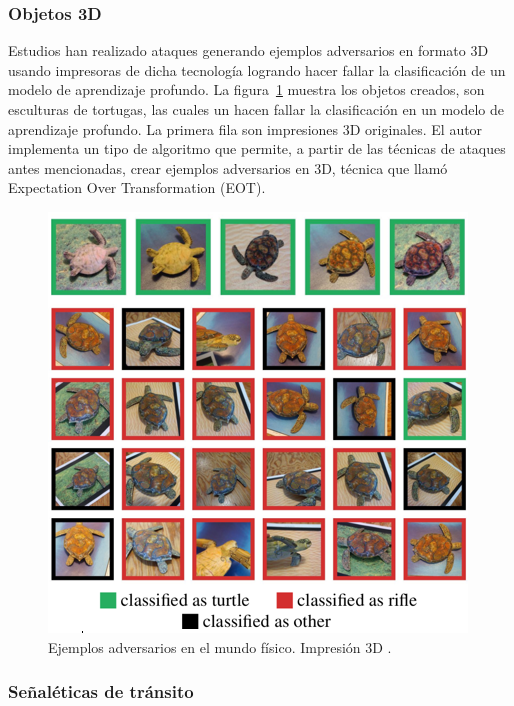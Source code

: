 \subsubsection{Objetos 3D}

Estudios han realizado ataques generando ejemplos adversarios en formato 3D usando impresoras de dicha tecnología \parencite{r52} logrando hacer fallar la clasificación de un modelo de aprendizaje profundo. La figura~\ref{fig:24} muestra los objetos creados, son esculturas de tortugas, las cuales un hacen fallar la clasificación en un modelo de aprendizaje profundo. La primera fila son impresiones 3D originales. El autor implementa un tipo de algoritmo que permite, a partir de las técnicas de ataques antes mencionadas, crear ejemplos adversarios en 3D, técnica que llamó Expectation Over Transformation (EOT).

\begin{figure}[th]
\centering
\includegraphics [scale = 1] {Figures/figura_24.PNG}
\decoRule
\caption[Ejemplos adversarios en el mundo físico. Impresión 3D]{Ejemplos adversarios en el mundo físico. Impresión 3D \parencite{r52}.}
\label{fig:24}
\end{figure}

\subsubsection{Señaléticas de tránsito}

